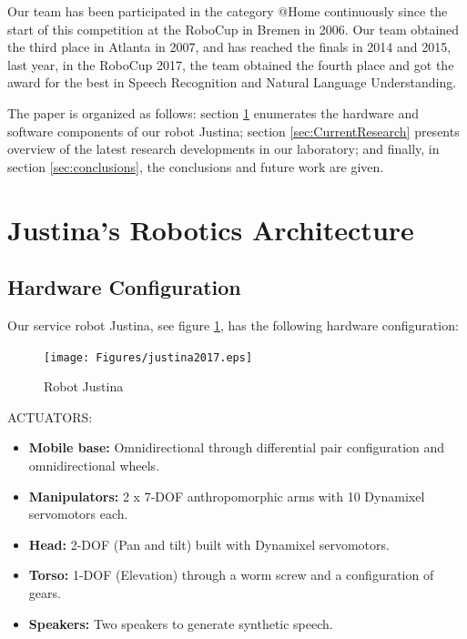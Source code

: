 \documentclass{llncs}
\begin{document}
Our team has been participated in the category @Home continuously since the start of this competition at the RoboCup in Bremen in 2006. Our team obtained the third place in Atlanta in 2007, and has reached the finals in 2014 and 2015, last year, in the RoboCup 2017, the team obtained the fourth place and got the award for the best in Speech Recognition and Natural Language Understanding.

The paper is organized as follows:
section \ref{sec:background} enumerates the hardware and software components of our robot
Justina; section \ref{sec:CurrentResearch}  presents overview of the latest research developments in our
laboratory; and finally, in section \ref{sec:conclusions}, the conclusions and future work are given.


\section{Justina's Robotics Architecture}\label{sec:background}
\subsection{Hardware Configuration}

Our service robot Justina, see figure \ref{fig:justina}, has the following hardware configuration:\\

\begin{figure}
	\texttt{[image: Figures/justina2017.eps]}
  \caption{Robot Justina}
  \label{fig:justina}
\end{figure}



ACTUATORS:

\begin{itemize}
	\item \textbf{Mobile base:} Omnidirectional through differential pair configuration and omnidirectional wheels. 
	\item \textbf{Manipulators:} 2 x 7-DOF anthropomorphic arms with 10 Dynamixel servomotors each.
	\item \textbf{Head:} 2-DOF (Pan and tilt) built with Dynamixel servomotors.
	\item \textbf{Torso:} 1-DOF (Elevation) through a worm screw and a configuration of gears. 
	\item \textbf{Speakers:} Two speakers to generate synthetic speech.
\end{itemize}
\end{document}
